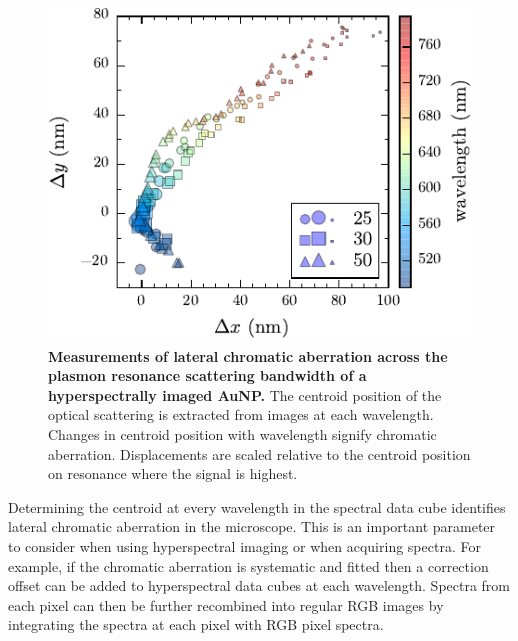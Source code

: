 \documentclass{article}
\begin{document}
\begin{figure}[bt]
\centering
\includegraphics{figures/lateral_chromatic_aberration}
\caption[Measurements of lateral chromatic aberration across the plasmon resonance scattering bandwidth of a hyperspectrally imaged AuNP.]{\textbf{Measurements of lateral chromatic aberration across the plasmon resonance scattering bandwidth of a hyperspectrally imaged AuNP.} The centroid position of the optical scattering is extracted from images at each wavelength. Changes in centroid position with wavelength signify chromatic aberration. Displacements are scaled relative to the centroid position on resonance where the signal is highest.}
\label{fig:lateral_chromatic_aberration}
\end{figure}

Determining the centroid at every wavelength in the spectral data cube identifies lateral chromatic aberration in the microscope. This is an important parameter to consider when using hyperspectral imaging or when acquiring spectra. For example, if the chromatic aberration is systematic and fitted then a correction offset can be added to hyperspectral data cubes at each wavelength. Spectra from each pixel can then be further recombined into regular RGB images by integrating the spectra at each pixel with RGB pixel spectra.
\end{document}
